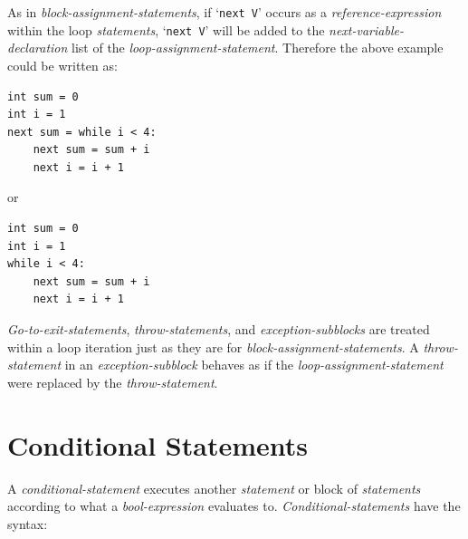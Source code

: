 \documentclass[12pt]{article}
\newenvironment{indpar}[1][0.3in]%
	{\begin{list}{}%
		     {\setlength{\itemsep}{0in}%
		      \setlength{\topsep}{0in}%
		      \setlength{\parsep}{1ex}%
		      \setlength{\labelwidth}{#1}%
		      \setlength{\leftmargin}{#1}%
		      \addtolength{\leftmargin}{\labelsep}}%
	 \item}%
	{\end{list}}
\begin{document}
\label{LOOP-NEXT-PROMOTION}
As in {\em block-assignment-statements}, if `{\tt next V}' occurs
as a {\em reference-expression} within the loop {\em statements},
`{\tt next V}' will be added to the {\em next-variable-declaration}
list of the {\em loop-assignment-statement}.  Therefore the
above example could be written as:
\begin{indpar}\begin{verbatim}
int sum = 0
int i = 1
next sum = while i < 4:
    next sum = sum + i
    next i = i + 1
\end{verbatim}\end{indpar}
or
\begin{indpar}\begin{verbatim}
int sum = 0
int i = 1
while i < 4:
    next sum = sum + i
    next i = i + 1
\end{verbatim}\end{indpar}

{\em Go-to-exit-statements}, {\em throw-statements},
and {\em exception-subblocks} are treated
within a loop iteration just as they are for {\em block-assignment-statements}.
A {\em throw-statement} in an {\em exception-subblock} behaves as if the
{\em loop-assignment-statement} were replaced by the {\em throw-statement}.

\section{Conditional Statements}
\label{CONDITIONAL-STATEMENTS}

A {\em conditional-statement} executes another {\em statement}
or block of {\em statements} according to what a
{\em bool-expression} evaluates to.
{\em Conditional-statements} have the syntax:
\end{document}
